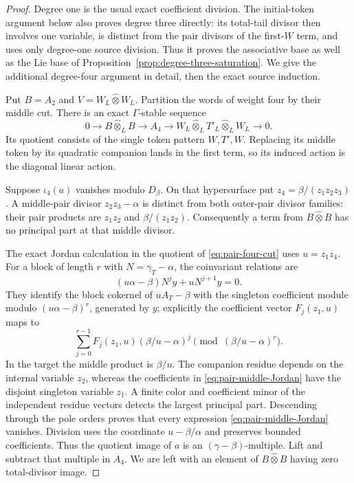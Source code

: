 \documentclass[11pt]{article}
\theoremstyle{definition}\newtheorem{definition}[theorem]{Definition}
\begin{document}
\begin{proof}
Degree one is the usual exact coefficient division.
The initial-token argument below also proves degree
three directly: its total-tail divisor then involves
one variable, is distinct from the pair divisors of
the first-$W$ term, and uses only degree-one source
division. Thus it proves the associative base as
well as the Lie base of
Proposition~\ref{prop:degree-three-saturation}.
We give the additional degree-four argument in
detail, then the exact source induction.

Put $B=A_2$ and $V=W_L\widehat\otimes W_L$. Partition
the words of weight four by their middle cut. There
is an exact $\Gamma$-stable sequence
\begin{equation}\label{eq:pair-four-cut}
 0\longrightarrow B\widehat\otimes_L B
 \longrightarrow A_4
 \longrightarrow W_L\widehat\otimes_L T'_L
                    \widehat\otimes_L W_L\longrightarrow0.
\end{equation}
Its quotient consists of the single token pattern
$W,T',W$. Replacing its middle token by its quadratic
companion lands in the first term, so its induced
action is the diagonal linear action.

Suppose $\iota_4(a)$ vanishes modulo $D_\beta$. On
that hypersurface put $z_4=\beta/(z_1z_2z_3)$.
A middle-pair divisor $z_2z_3-\alpha$ is distinct
from both outer-pair divisor families: their pair
products are $z_1z_2$ and $\beta/(z_1z_2)$.
Consequently a term from $B\widehat\otimes B$ has
no principal part at that middle divisor.

The exact Jordan calculation in the quotient of
\eqref{eq:pair-four-cut} uses $u=z_1z_4$.
For a block of length $r$ with $N=\gamma_T-\alpha$,
the coinvariant relations are
\[
 (u\alpha-\beta)N^jy+uN^{j+1}y=0.
\]
They identify the block cokernel of $uA_T-\beta$
with the singleton coefficient module modulo
$(u\alpha-\beta)^r$, generated by $y$; explicitly
the coefficient vector $F_j(z_1,u)$ maps to
\begin{equation}\label{eq:pair-middle-Jordan}
 \sum_{j=0}^{r-1}F_j(z_1,u)(\beta/u-\alpha)^j
                         \pmod{(\beta/u-\alpha)^r}.
\end{equation}
In the target the middle product is $\beta/u$.
The companion residue depends on the internal
variable $z_2$, whereas the coefficients in
\eqref{eq:pair-middle-Jordan} have the disjoint
singleton variable $z_1$. A finite color and
coefficient minor of the independent residue vectors
detects the largest principal part. Descending through
the pole orders proves that every expression
\eqref{eq:pair-middle-Jordan} vanishes. Division uses
the coordinate $u-\beta/\alpha$ and preserves bounded
coefficients. Thus the quotient image of $a$ is an
$(\gamma-\beta)$-multiple. Lift and subtract
that multiple in $A_4$. We are left with an element
of $B\widehat\otimes B$ having zero total-divisor image.


\end{proof}
\end{document}
